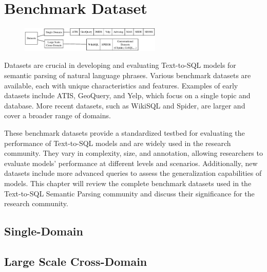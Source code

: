 \section{Benchmark Dataset}

\begin{figure}[H]
    \centering
    \includegraphics[width=0.6\textwidth]{pics/mindmap/ds/ds.eps}
    \label{fig:ds}
\end{figure}

Datasets are crucial in developing and evaluating Text-to-SQL models for semantic parsing of natural language phrases. Various benchmark datasets are available, each with unique characteristics and features. Examples of early datasets include ATIS\cite{dahl-etal-1994-expanding}, GeoQuery\cite{10.1007/3-540-44795-4_40}, and Yelp\cite{10.1145/3133887}, which focus on a single topic and database. More recent datasets, such as WikiSQL\cite{zhong_seq2sql_2017} and Spider\cite{yu_spider_2019}, are larger and cover a broader range of domains.

These benchmark datasets provide a standardized testbed for evaluating the performance of Text-to-SQL models and are widely used in the research community. They vary in complexity, size, and annotation, allowing researchers to evaluate models' performance at different levels and scenarios. Additionally, new datasets include more advanced queries to assess the generalization capabilities of models. This chapter will review the complete benchmark datasets used in the Text-to-SQL Semantic Parsing community and discuss their significance for the research community.

\subsection{Single-Domain}








\clearpage

\subsection{Large Scale Cross-Domain}





